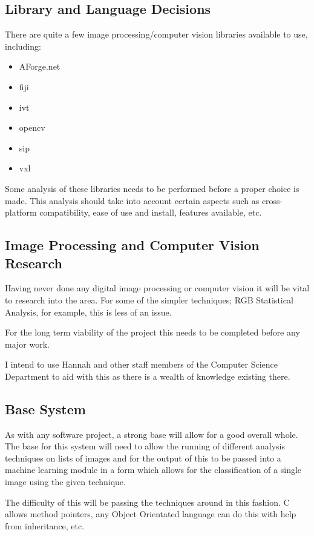 \documentclass[11pt,fleqn,twoside]{article}
\begin{document}
\subsection{Library and Language Decisions}
There are quite a few image processing/computer vision libraries available to use, including:

\begin{itemize}
\item AForge.net
\item \gls{fiji}
\item \gls{ivt}
\item \gls{opencv}
\item \gls{sip}
\item \gls{vxl}
\end{itemize}

Some analysis of these libraries needs to be performed before a proper choice is made. This analysis should take into account certain aspects such as cross-platform compatibility, ease of use and install, features available, etc.


\subsection{Image Processing and Computer Vision Research}
Having never done any digital image processing or computer vision it will be vital to research into the area. For some of the simpler techniques; RGB Statistical Analysis, for example, this is less of an issue. 

For the long term viability of the project this needs to be completed before any major work.

I intend to use Hannah and other staff members of the Computer Science Department to aid with this as there is a wealth of knowledge existing there.


\subsection{Base System}
As with any software project, a strong base will allow for a good overall whole. The base for this system will need to allow the running of different analysis techniques on lists of images and for the output of this to be passed into a machine learning module in a form which allows for the classification of a single image using the given technique.

The difficulty of this will be passing the techniques around in this fashion. C allows method pointers, any Object Orientated language can do this with help from inheritance, etc.
\end{document}
